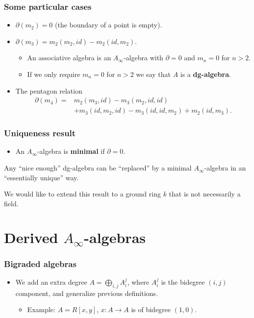 \documentclass{beamer}
\theoremstyle{definition}
\begin{document}
\begin{frame}
\frametitle{Some particular cases}

\begin{itemize}
\item<1-> $\partial(m_2)=0$ (the boundary of a point is empty).
\item<2-> $\partial(m_3)=m_2(m_2, id)-m_2(id, m_2)$.
\begin{itemize}
\item<3-> An associative algebra is an $A_\infty$-algebra with $\partial=0$ and $m_n=0$ for $n>2$.
\item<4-> If we only require $m_n=0$ for $n>2$ we say that $A$ is a \textbf{dg-algebra}. %
\end{itemize}
\item<5-> The pentagon relation \begin{align*}
\partial(m_4)=&m_2(m_3, id)-m_3(m_2, id, id)\\
&+m_3(id, m_2, id)-m_3(id, id, m_2)+m_2(id, m_3).
\end{align*}
\end{itemize}
\end{frame}

\begin{frame}
\frametitle{Uniqueness result}
\begin{itemize}
\item An $A_\infty$-algebra is \textbf{minimal} if $\partial = 0$. 
\end{itemize}\pause
\begin{theorem}[Kadeishvili]
Any ``nice enough'' dg-algebra can be ``replaced'' by a minimal $A_\infty$-algebra in an ``essentially unique'' way.
\end{theorem}\pause
We would like to extend this result to a ground ring $k$ that is not necessarily a field.
\end{frame}

\section{Derived $A_\infty$-algebras}

\begin{frame}
\frametitle{Bigraded algebras}
\begin{itemize}
\item We add an extra degree $A=\bigoplus_{i,j} A_i^j$, where $A_i^j$ is the bidegree $(i,j)$ component, and generalize previous definitions.
\begin{itemize}
\item<2-> Example: $A=R[x,y]$, $x:A\to A$ is of bidegree $(1,0)$.
\end{itemize}
\end{itemize}
\end{frame}
\end{document}
